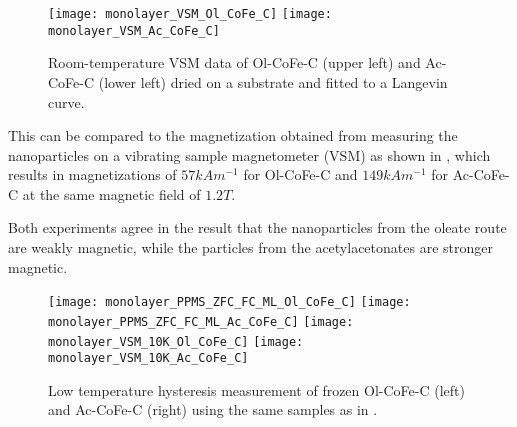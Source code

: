 \documentclass[\main/dresen_thesis.tex]{subfiles}
\begin{document}
  \label{sec:monolayers:nanoparticle:vsm}

    \begin{figure}[tb]
      \centering
      \texttt{[image: monolayer\_VSM\_Ol\_CoFe\_C]}
      \texttt{[image: monolayer\_VSM\_Ac\_CoFe\_C]}
      \caption{\label{fig:monolayers:nanoparticle:vsm}Room-temperature VSM data of Ol-CoFe-C (upper left) and Ac-CoFe-C (lower left) dried on a substrate and fitted to a Langevin curve.}
    \end{figure}

    This can be compared to the magnetization obtained from measuring the nanoparticles on a vibrating sample magnetometer (VSM) as shown in , which results in magnetizations of $57 \unit{kAm^{-1}}$ for Ol-CoFe-C and $149 \unit{kAm^{-1}}$ for Ac-CoFe-C at the same magnetic field of $1.2 \unit{T}$.

    Both experiments agree in the result that the nanoparticles from the oleate route are weakly magnetic, while the particles from the acetylacetonates are stronger magnetic.

  \begin{figure}[tb]
    \centering
    \texttt{[image: monolayer\_PPMS\_ZFC\_FC\_ML\_Ol\_CoFe\_C]}
    \texttt{[image: monolayer\_PPMS\_ZFC\_FC\_ML\_Ac\_CoFe\_C]}
    \texttt{[image: monolayer\_VSM\_10K\_Ol\_CoFe\_C]}
    \texttt{[image: monolayer\_VSM\_10K\_Ac\_CoFe\_C]}
    \caption{\label{fig:monolaye rs:nanoparticle:vsm10K}Low temperature hysteresis measurement of frozen Ol-CoFe-C (left) and Ac-CoFe-C (right) using the same samples as in .}
  \end{figure}
\end{document}
